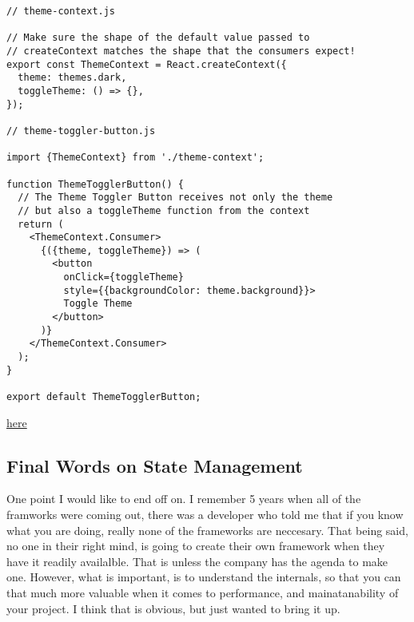 \begin{lstlisting}
// theme-context.js

// Make sure the shape of the default value passed to
// createContext matches the shape that the consumers expect!
export const ThemeContext = React.createContext({
  theme: themes.dark,
  toggleTheme: () => {},
});

// theme-toggler-button.js

import {ThemeContext} from './theme-context';

function ThemeTogglerButton() {
  // The Theme Toggler Button receives not only the theme
  // but also a toggleTheme function from the context
  return (
    <ThemeContext.Consumer>
      {({theme, toggleTheme}) => (
        <button
          onClick={toggleTheme}
          style={{backgroundColor: theme.background}}>
          Toggle Theme
        </button>
      )}
    </ThemeContext.Consumer>
  );
}

export default ThemeTogglerButton;
\end{lstlisting}
\href{https://reactjs.org/docs/context.html}{here}

\subsection{ Final Words on State Management }
One point I would like to end off on. I remember 5 years when all of the
framworks were coming out, there was a developer who told me that if you know
what you are doing, really none of the frameworks are neccesary. That being said,
no one in their right mind, is going to create their own framework when they have
it readily availalble. That is unless the company has the agenda to make one.
However, what is important, is to understand the internals, so that you can
that much more valuable when it comes to performance, and mainatanability of
your project. I think that is obvious, but just wanted to bring it up.
